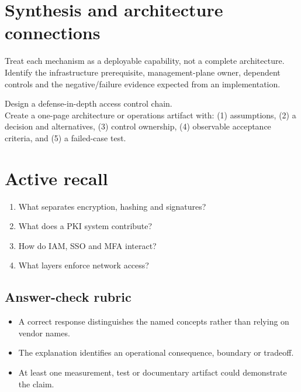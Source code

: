 \documentclass[10pt,letterpaper]{article}
\begin{document}
\section{Synthesis and architecture connections}
Treat each mechanism as a deployable capability, not a complete architecture. Identify the infrastructure prerequisite, management-plane owner, dependent controls and the negative/failure evidence expected from an implementation.
\begin{workbox}[title={Applied deliverable}]
Design a defense-in-depth access control chain.\\[4pt]Create a one-page architecture or operations artifact with: (1) assumptions, (2) a decision and alternatives, (3) control ownership, (4) observable acceptance criteria, and (5) a failed-case test.
\end{workbox}
\section{Active recall}
\begin{enumerate}
\item What separates encryption, hashing and signatures?
\item What does a PKI system contribute?
\item How do IAM, SSO and MFA interact?
\item What layers enforce network access?
\end{enumerate}
\subsection{Answer-check rubric}
\begin{itemize}
\item A correct response distinguishes the named concepts rather than relying on vendor names.
\item The explanation identifies an operational consequence, boundary or tradeoff.
\item At least one measurement, test or documentary artifact could demonstrate the claim.
\end{itemize}
\end{document}
